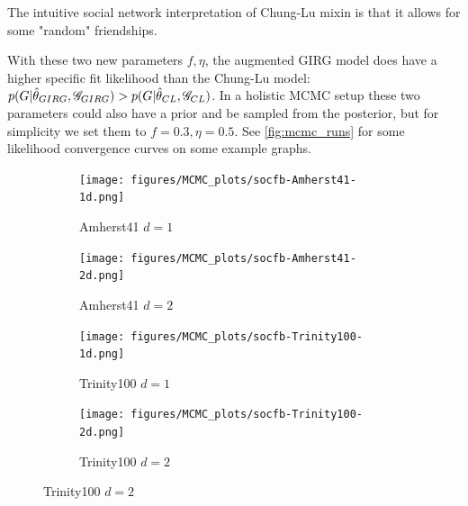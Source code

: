 The intuitive social network interpretation of Chung-Lu mixin is that it allows for some "random" friendships.


With these two new parameters $f, \eta$, the augmented GIRG model does have a higher specific fit likelihood than the Chung-Lu model: $p(G | \hat{\theta}_{GIRG}, \mathscr{G}_{GIRG}) > p(G | \hat{\theta}_{CL}, \mathscr{G}_{CL})$. In a holistic MCMC setup these two parameters could also have a prior and be sampled from the posterior, but for simplicity we set them to $f=0.3, \eta=0.5$. See \cref{fig:mcmc_runs} for some likelihood convergence curves on some example graphs.




\begin{figure}
  \centering

  \begin{subfigure}{0.49\textwidth}
    \centering
    \texttt{[image: figures/MCMC\_plots/socfb-Amherst41-1d.png]}
    \caption{Amherst41 $d=1$}
  \end{subfigure}
  \hfill
  \begin{subfigure}{0.49\textwidth}
    \centering
    \texttt{[image: figures/MCMC\_plots/socfb-Amherst41-2d.png]}
    \caption{Amherst41 $d=2$}
  \end{subfigure}

  \vspace{1em}

  \begin{subfigure}{0.49\textwidth}
    \centering
    \texttt{[image: figures/MCMC\_plots/socfb-Trinity100-1d.png]}
    \caption{Trinity100 $d=1$}
  \end{subfigure}
  \hfill
  \begin{subfigure}{0.49\textwidth}
    \centering
    \texttt{[image: figures/MCMC\_plots/socfb-Trinity100-2d.png]}
    \caption{Trinity100 $d=2$}
  \end{subfigure}


\end{figure}
